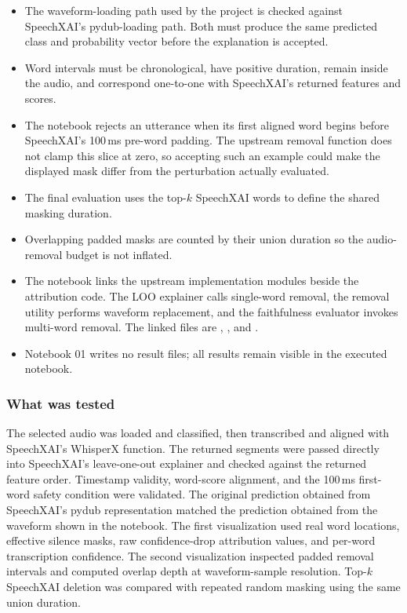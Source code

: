 \documentclass[11pt]{article}
\begin{document}
\begin{itemize}
  \item The waveform-loading path used by the project is checked against SpeechXAI's pydub-loading path. Both must produce the same predicted class and probability vector before the explanation is accepted.
  \item Word intervals must be chronological, have positive duration, remain inside the audio, and correspond one-to-one with SpeechXAI's returned features and scores.
  \item The notebook rejects an utterance when its first aligned word begins before SpeechXAI's 100\,ms pre-word padding. The upstream removal function does not clamp this slice at zero, so accepting such an example could make the displayed mask differ from the perturbation actually evaluated.
  \item The final evaluation uses the top-$k$ SpeechXAI words to define the shared masking duration.
  \item Overlapping padded masks are counted by their union duration so the audio-removal budget is not inflated.
  \item The notebook links the upstream implementation modules beside the attribution code. The LOO explainer calls single-word removal, the removal utility performs waveform replacement, and the faithfulness evaluator invokes multi-word removal. The linked files are , , and .
  \item Notebook 01 writes no result files; all results remain visible in the executed notebook.
\end{itemize}

\subsubsection*{What was tested}
The selected audio was loaded and classified, then transcribed and aligned with SpeechXAI's WhisperX function. The returned segments were passed directly into SpeechXAI's leave-one-out explainer and checked against the returned feature order. Timestamp validity, word-score alignment, and the 100\,ms first-word safety condition were validated. The original prediction obtained from SpeechXAI's pydub representation matched the prediction obtained from the waveform shown in the notebook. The first visualization used real word locations, effective silence masks, raw confidence-drop attribution values, and per-word transcription confidence. The second visualization inspected padded removal intervals and computed overlap depth at waveform-sample resolution. Top-$k$ SpeechXAI deletion was compared with repeated random masking using the same union duration.
\end{document}
